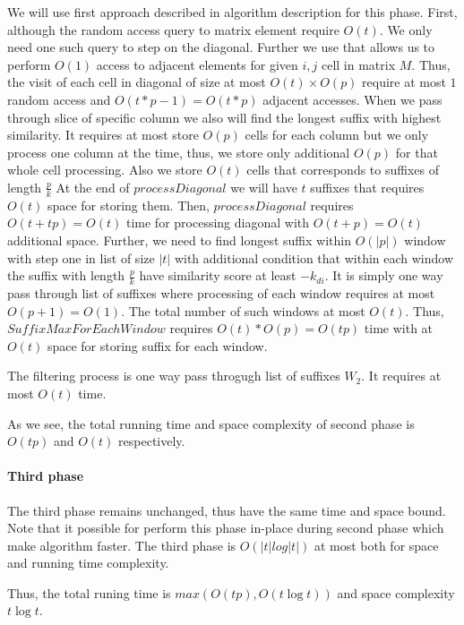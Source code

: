 We will use first approach described in algorithm description for this phase.
First, although the random access query to matrix element require $O(t)$.
We only need one such query to step on the diagonal.
Further we use  that allows us to perform $O(1)$ access to adjacent elements for given $i,j$ cell in matrix $M$.
Thus, the visit of each cell in diagonal of size at most $O(t) \times O(p) $ require at most $1$ random access and $O(t*p -1) =O(t*p)$ adjacent accesses.
When we pass through slice of specific column we also will find the longest suffix with highest similarity.
It requires at most store $O(p)$ cells for each column but we only process one column at the time, thus, we store only  additional $O(p)$ for that whole cell processing.
Also we store $O(t)$ cells that corresponds to suffixes of length $\frac{p}{k}$  
At the end of  $processDiagonal$ we will have $t$ suffixes that requires $O(t)$  space for storing them.
Then, $processDiagonal$ requires $O(t+tp)=O(t)$ time for processing diagonal with $O(t+p)=O(t)$ additional space. 
Further, we need to find longest suffix within $O(|p|)$ window with step one in list of size $|t|$ with additional condition that within each window the suffix with length $\frac{p}{k}$ have similarity score at least $-k_{di}$.
It is simply one way pass through list of suffixes where processing of each window requires at most $O(p+1)=O(1)$.
The total number of such windows at most $O(t)$.
Thus, $SuffixMaxForEachWindow$ requires $O(t)*O(p)=O(tp)$ time with at $O(t)$ space for storing suffix for each window. 

The filtering process is one way pass throgugh list of suffixes $W_2$.
It requires at most $O(t)$ time.

As we see, the total running time and space complexity of second phase is $O(tp)$ and $O(t)$ respectively.

\paragraph{Third phase}
The third phase remains unchanged, thus have the  same time and space bound.
Note that it possible for perform this phase in-place during second phase which 
make algorithm faster.
The third phase is $O(|t| log|t|)$  at most both for space and running time complexity.

Thus, the total runing time is $max(O(tp),O(t \log t))$ and space complexity $t \log t$. 


